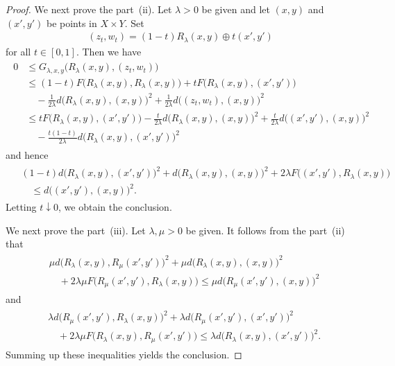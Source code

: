 \documentclass[draft]{amsart}
\numberwithin{equation}{section}
\theoremstyle{plain}
\theoremstyle{definition}
\theoremstyle{remark}
\begin{document}
\begin{proof}
 We next prove the part~(ii). Let $\lambda>0$ be given 
 and let $(x,y)$ and $(x',y')$ be points in $X\times Y$. 
 Set 
 \begin{align}
  (z_t,w_t) = (1-t)R_{\lambda}(x,y) \oplus t(x',y')
 \end{align}
 for all $t\in [0,1]$. Then we have 
 \begin{align}
 \begin{split}
  0
 &\leq G_{\lambda,x,y}\bigl(R_{\lambda}(x,y),(z_t,w_t)\bigr) \\
 &\leq (1-t)F\bigl(R_{\lambda}(x,y),R_{\lambda}(x,y)\bigr) 
 + tF\bigl(R_{\lambda}(x,y),(x',y')\bigr) \\
 &\quad -\frac{1}{2\lambda}d\bigl(R_{\lambda}(x,y),(x,y)\bigr)^2 
 +\frac{1}{2\lambda}d\bigl((z_t,w_t),(x,y)\bigr)^2 \\
 &\leq tF\bigl(R_{\lambda}(x,y),(x',y')\bigr) 
 -\frac{t}{2\lambda}d\bigl(R_{\lambda}(x,y),(x,y)\bigr)^2 
 +\frac{t}{2\lambda}d\bigl((x',y'),(x,y)\bigr)^2 \\
 &\quad 
-\frac{t(1-t)}{2\lambda}d\bigl(R_{\lambda}(x,y),(x',y')\bigr)^2  
 \end{split}
 \end{align}
 and hence 
 \begin{align}
 \begin{split}
 &(1-t)d\bigl(R_{\lambda}(x,y),(x',y')\bigr)^2 
 + d\bigl(R_{\lambda}(x,y),(x,y)\bigr)^2 
 + 2\lambda F\bigl((x',y'),R_{\lambda}(x,y)\bigr) \\
 &\quad \leq d\bigl((x',y'),(x,y)\bigr)^2.   
 \end{split}
 \end{align}
 Letting $t\downarrow 0$, we obtain the conclusion. 

 We next prove the part~(iii). Let $\lambda, \mu>0$ be given. 
 It follows from the part~(ii) that 
 \begin{align}
 \begin{split}
 &\mu d\bigl(R_{\lambda}(x,y),R_{\mu}(x',y')\bigr)^2 
 + \mu d\bigl(R_{\lambda}(x,y),(x,y)\bigr)^2 \\
 &\quad + 2\lambda \mu F\bigl(R_{\mu}(x',y'),R_{\lambda}(x,y)\bigr) 
 \leq \mu d\bigl(R_{\mu}(x',y'),(x,y)\bigr)^2  
 \end{split}
 \end{align}
 and 
 \begin{align}
 \begin{split}
 &\lambda d\bigl(R_{\mu}(x',y'),R_{\lambda}(x,y)\bigr)^2 
 + \lambda d\bigl(R_{\mu}(x',y'),(x',y')\bigr)^2 \\
 &\quad + 2\lambda \mu F\bigl(R_{\lambda}(x,y),R_{\mu}(x',y')\bigr) 
 \leq \lambda d\bigl(R_{\lambda}(x,y),(x',y')\bigr)^2.   
 \end{split}
 \end{align}
 Summing up these inequalities yields the conclusion. 


\end{proof}
\end{document}
